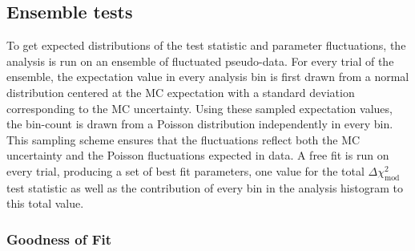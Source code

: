 \subsection{Ensemble tests}
\label{sec:three-flavor-ensemble}
To get expected distributions of the test statistic and parameter fluctuations, the analysis is run on an ensemble of fluctuated pseudo-data. For every trial of the ensemble, the expectation value in every analysis bin is first drawn from a normal distribution centered at the MC expectation with a standard deviation corresponding to the MC uncertainty. Using these sampled expectation values, the bin-count is drawn from a Poisson distribution independently in every bin. This sampling scheme ensures that the fluctuations reflect both the MC uncertainty and the Poisson fluctuations expected in data. A free fit is run on every trial, producing a set of best fit parameters, one value for the total $\Delta \chi^2_{\mathrm{mod}}$ test statistic as well as the contribution of every bin in the analysis histogram to this total value.



\subsubsection{Goodness of Fit}

